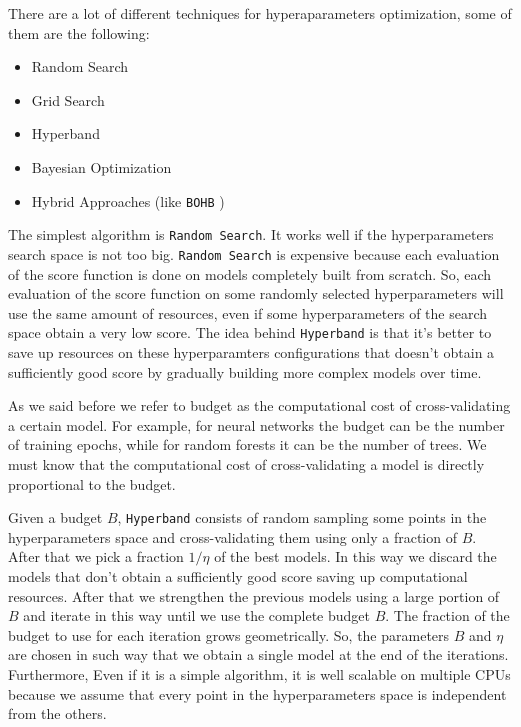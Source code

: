 \documentclass[11pt, a4paper]{article}
\begin{document}
  There are a lot of different techniques for hyperaparameters optimization, some of them are the following:
  \begin{itemize}
    \item Random Search
    \item Grid Search
    \item Hyperband
    \item Bayesian Optimization
    \item Hybrid Approaches (like \texttt{BOHB} \cite{bohb})
  \end{itemize}

  The simplest algorithm is \texttt{Random Search}. It works well if the hyperparameters search space is not too big. \texttt{Random Search} is expensive because each evaluation of the score function is done on models completely built from scratch. So, each evaluation of the score function on some randomly selected hyperparameters will use the same amount of resources, even if some hyperparameters of the search space obtain a very low score. The idea behind \texttt{Hyperband} is that it's better to save up resources on these hyperparamters configurations that doesn't obtain a sufficiently good score by gradually building more complex models over time.
  
  As we said before we refer to budget as the computational cost of cross-validating a certain model. For example, for neural networks the budget can be the number of training epochs, while for random forests it can be the number of trees. We must know that the computational cost of cross-validating a model is directly proportional to the budget.

  Given a budget $B$, \texttt{Hyperband} consists of random sampling some points in the hyperparameters space and cross-validating them using only a fraction of $B$. After that we pick a fraction $1/\eta$ of the best models. In this way we discard the models that don't obtain a sufficiently good score saving up computational resources. After that we strengthen the previous models using a large portion of $B$ and iterate in this way until we use the complete budget $B$. The fraction of the budget to use for each iteration grows geometrically. So, the parameters $B$ and $\eta$ are chosen in such way that we obtain a single model at the end of the iterations. Furthermore, 
  Even if it is a simple algorithm, it is well scalable on multiple CPUs because we assume that every point in the hyperparameters space is independent from the others.
\end{document}
